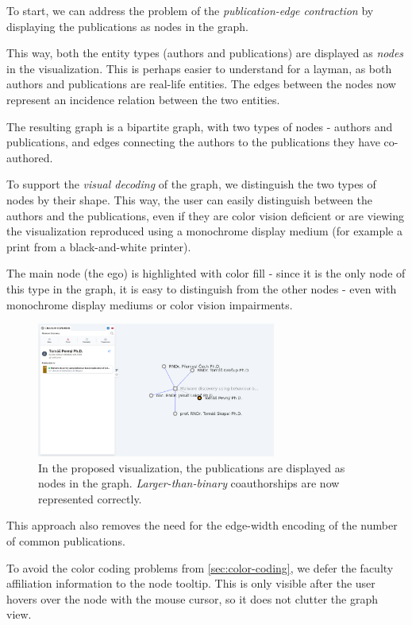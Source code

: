 To start, we can address the problem of the \textit{publication-edge contraction} by displaying the publications as nodes in the graph.

This way, both the entity types (authors and publications) are displayed as \textit{nodes} in the visualization.
This is perhaps easier to understand for a layman, as both authors and publications are real-life entities. 
The edges between the nodes now represent an incidence relation between the two entities.

The resulting graph is a bipartite graph, with two types of nodes - authors and publications, and edges connecting the authors to the publications they have co-authored.

To support the \textit{visual decoding} of the graph, we distinguish the two types of nodes by their shape. 
This way, the user can easily distinguish between the authors and the publications, even if they are color vision deficient 
or are viewing the visualization reproduced using a monochrome display medium (for example a print from a black-and-white printer).

The main node (the ego) is highlighted with color fill - since it is the only node of this type in the graph,
it is easy to distinguish from the other nodes - even with monochrome display mediums or color vision impairments.

\begin{figure}[ht!]
    \captionsetup{width=.9\linewidth}
    \includegraphics[width=0.7\textwidth]{../img/publications-and-people.png}
    \centering
    \caption{In the proposed visualization, the publications are displayed as nodes in the graph. \textit{Larger-than-binary} coauthorships are now represented correctly.}
\end{figure}

This approach also removes the need for the edge-width encoding of the number of common publications.

To avoid the color coding problems from \ref{sec:color-coding}, we defer the faculty affiliation information to the node tooltip.
This is only visible after the user hovers over the node with the mouse cursor, so it does not clutter the graph view.

